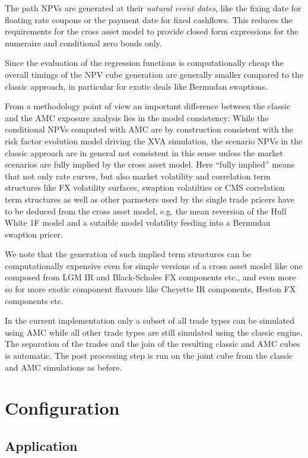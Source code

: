 \documentclass[12pt, a4paper]{article}
\begin{document}
The path NPVs are generated at their {\em natural event dates}, like the fixing date for floating rate coupons or the
payment date for fixed cashflows. This reduces the requirements for the cross asset model to provide closed form
expressions for the numeraire and conditional zero bonds only.

Since the evaluation of the regression functions is computationally cheap the overall timings of the NPV cube generation
are generally smaller compared to the classic approach, in particular for exotic deals like Bermudan swaptions.

From a methodology point of view an important difference between the classic and the AMC exposure analysis lies in the
model consistency: While the conditional NPVs computed with AMC are by construction consistent with the risk factor
evolution model driving the XVA simulation, the scenario NPVs in the classic approach are in general not consistent in
this sense unless the market scenarios are fully implied by the cross asset model. Here ``fully implied'' means that not
only rate curves, but also market volatility and correlation term structures like FX volatility surfaces, swaption
volatilties or CMS correlation term structures as well as other parmeters used by the single trade pricers have to be
deduced from the cross asset model, e.g. the mean reversion of the Hull White 1F model and a sutaible model volatility
feeding into a Bermudan swaption pricer.

We note that the generation of such implied term structures can be computationally expensive even for simple versions of
a cross asset model like one composed from LGM IR and Black-Scholes FX components etc., and even more so for more exotic
component flavours like Cheyette IR components, Heston FX components etc.

In the current implementation only a subset of all trade types can be simulated using AMC while all other trade types
are still simulated using the classic engine. The separation of the trades and the join of the resulting classic and AMC
cubes is automatic. The post processing step is run on the joint cube from the classic and AMC simulations as before.

\section{Configuration}

\subsection{Application}\label{sec:application_config}
\end{document}
